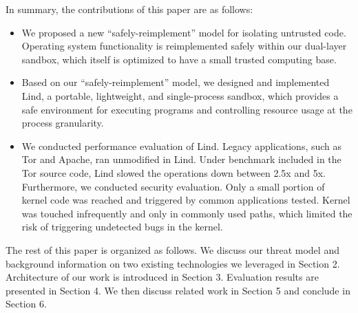 \par
In summary, the contributions of this paper are as follows:

\begin{itemize} 
  
  \item We proposed a new ``safely-reimplement'' model for isolating untrusted code. Operating system functionality is reimplemented safely within our dual-layer sandbox, which itself is optimized to have a small trusted computing base. 
  
  \item Based on our ``safely-reimplement'' model, we designed and implemented Lind, a portable, lightweight, and single-process sandbox, which provides a safe environment for executing programs and controlling resource usage at the process granularity.
  
  \item We conducted performance evaluation of Lind. Legacy applications, such as Tor and Apache, ran unmodified in Lind. Under benchmark included in the Tor source code, Lind slowed the operations down between 2.5x and 5x. Furthermore, we conducted security evaluation. Only a small portion of kernel code was reached and triggered by common applications tested. Kernel was touched infrequently and only in commonly used paths, which limited the risk of triggering undetected bugs in the kernel. 

\end{itemize}


\par
The rest of this paper is organized as follows. We discuss our threat model and background information on two existing technologies we leveraged in Section 2. Architecture of our work is introduced in Section 3. Evaluation results are presented in Section 4. We then discuss related work in Section 5 and conclude in Section 6.  
